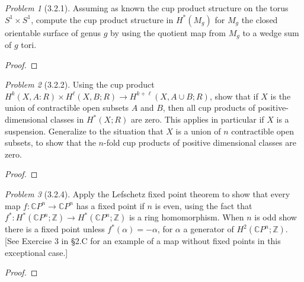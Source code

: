 \documentclass[10pt]{article}
\newcommand{\sk}{\vskip 10mm}
\newcommand{\bb}[1]{\mathbb{#1}}
\theoremstyle{remark}
\newtheorem{problem}{Problem}
\begin{document}
\begin{problem}[3.2.1]
  Assuming as known the cup product structure on the torus $S^1\times S^1$,
  compute the cup product structure in $H^*(M_g)$ for $M_g$ the closed
  orientable surface of genus $g$ by using the quotient map from $M_g$
  to a wedge sum of $g$ tori.
\end{problem}

\begin{proof}
  
\end{proof}

\sk

\begin{problem}[3.2.2]
  Using the cup product
  $H^k(X,A:R)\times H^\ell(X,B;R)\rightarrow H^{k+\ell}(X,A\cup B;R)$, show that
  if $X$ is the union of contractible open subsets $A$ and $B$, then all cup
  products of positive-dimensional classes in $H^*(X;R)$ are zero. This applies
  in particular if $X$ is a suspension. Generalize to the situation that $X$ is
  a union of $n$ contractible open subsets, to show that the $n$-fold cup
  products of positive dimensional classes are zero.
\end{problem}

\begin{proof}
  
\end{proof}

\sk

\begin{problem}[3.2.4]
  Apply the Lefschetz fixed point theorem to show that every map
  $f:\bb{C}P^n\rightarrow\bb{C}P^n$ has a fixed point if $n$ is even, using
  the fact that $f^*:H^*(\bb{C}P^n;\bb{Z})\rightarrow H^*(\bb{C}P^n;\bb{Z})$
  is a ring homomorphism. When $n$ is odd show there is a fixed point unless
  $f^*(\alpha)=-\alpha$, for $\alpha$ a generator of $H^2(\bb{C}P^n;\bb{Z})$.
  [See Exercise 3 in \S 2.C for an example of a map without fixed points in
  this exceptional case.]
\end{problem}

\begin{proof}
  
\end{proof}
\end{document}
